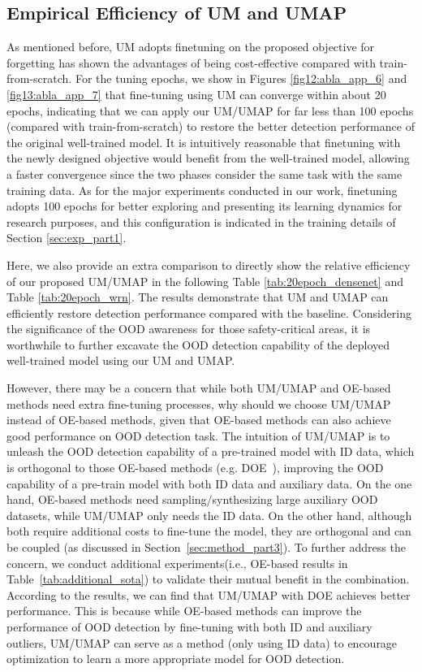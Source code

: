 \documentclass{article}
\theoremstyle{plain}
\theoremstyle{definition}
\theoremstyle{remark}
\begin{document}
\subsection{Empirical Efficiency of UM and UMAP}
\label{app:exp_less_epochs}



As mentioned before, UM adopts finetuning on the proposed objective for forgetting has shown the advantages of being cost-effective compared with train-from-scratch. For the tuning epochs, we show in Figures \ref{fig12:abla_app_6} and \ref{fig13:abla_app_7} that fine-tuning using UM can converge within about 20 epochs, indicating that we can apply our UM/UMAP for far less than 100 epochs (compared with train-from-scratch) to restore the better detection performance of the original well-trained model. It is intuitively reasonable that finetuning with the newly designed objective would benefit from the well-trained model, allowing a faster convergence since the two phases consider the same task with the same training data. As for the major experiments conducted in our work, finetuning adopts 100 epochs for better exploring and presenting its learning dynamics for research purposes, and this configuration is indicated in the training details of Section \ref{sec:exp_part1}.

Here, we also provide an extra comparison to directly show the relative efficiency of our proposed UM/UMAP in the following Table \ref{tab:20epoch_densenet} and Table \ref{tab:20epoch_wrn}. The results demonstrate that UM and UMAP can efficiently restore detection performance compared with the baseline. Considering the significance of the OOD awareness for those safety-critical areas, it is worthwhile to further excavate the OOD detection capability of the deployed well-trained model using our UM and UMAP. 

However, there may be a concern that while both UM/UMAP and OE-based methods need extra fine-tuning processes, why should we choose UM/UMAP instead of OE-based methods, given that OE-based methods can also achieve good performance on OOD detection task. The intuition of UM/UMAP is to unleash the OOD detection capability of a pre-trained model with ID data, which is orthogonal to those OE-based methods (e.g. DOE~\citep{wang2023outofdistribution}), improving the OOD capability of a pre-train model with both ID data and auxiliary data. On the one hand, OE-based methods need sampling/synthesizing large auxiliary OOD datasets, while UM/UMAP only needs the ID data. On the other hand, although both require additional costs to fine-tune the model, they are orthogonal and can be coupled (as discussed in Section~\ref{sec:method_part3}). To further address the concern, we conduct additional experiments(i.e., OE-based results in Table~\ref{tab:additional_sota}) to validate their mutual benefit in the combination. According to the results, we can find that UM/UMAP with DOE achieves better performance. This is because while OE-based methods can improve the performance of OOD detection by fine-tuning with both ID and auxiliary outliers, UM/UMAP can serve as a method (only using ID data) to encourage optimization to learn a more appropriate model for OOD detection.
\end{document}
